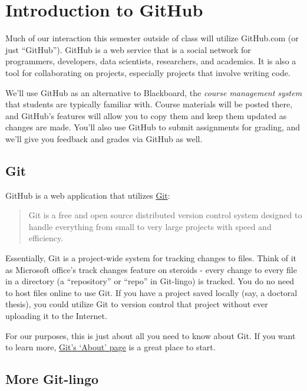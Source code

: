 \documentclass[]{book}
\theoremstyle{definition}
\theoremstyle{definition}
\theoremstyle{remark}
\begin{document}
\chapter{Introduction to GitHub}\label{introduction-to-github}

Much of our interaction this semester outside of class will utilize
GitHub.com (or just ``GitHub''). GitHub is a web service that is a
social network for programmers, developers, data scientists,
researchers, and academics. It is also a tool for collaborating on
projects, especially projects that involve writing code.

We'll use GitHub as an alternative to Blackboard, the \emph{course
management system} that students are typically familiar with. Course
materials will be posted there, and GitHub's features will allow you to
copy them and keep them updated as changes are made. You'll also use
GitHub to submit assignments for grading, and we'll give you feedback
and grades via GitHub as well.

\section{Git}\label{git}

GitHub is a web application that utilizes
\href{https://git-scm.com}{Git}:

\begin{quote}
Git is a free and open source distributed version control system
designed to handle everything from small to very large projects with
speed and efficiency.
\end{quote}

Essentially, Git is a project-wide system for tracking changes to files.
Think of it as Microsoft office's track changes feature on steroids -
every change to every file in a directory (a ``repository'' or ``repo''
in Git-lingo) is tracked. You do no need to host files online to use
Git. If you have a project saved locally (say, a doctoral thesis), you
could utilize Git to version control that project without ever uploading
it to the Internet.

For our purposes, this is just about all you need to know about Git. If
you want to learn more, \href{https://git-scm.com/about}{Git's `About'
page} is a great place to start.

\section{More Git-lingo}\label{more-git-lingo}
\end{document}
